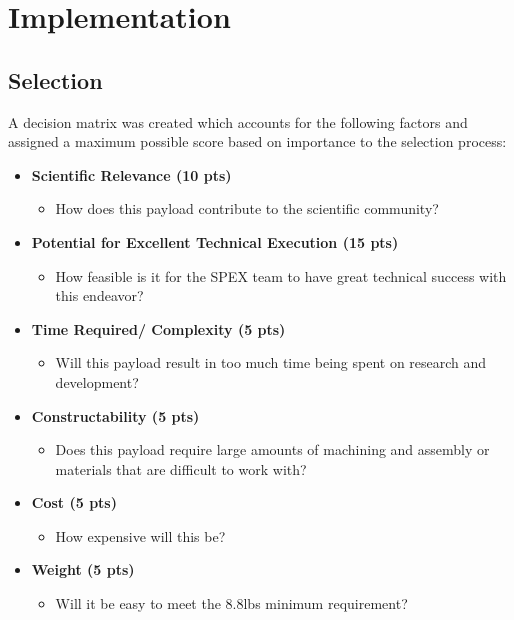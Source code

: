 \documentclass[conference]{IEEEtran} %
\begin{document}
\section{Implementation}
\label{sec:Implementation}

\subsection{Selection}
\label{subsec:Selection}
A decision matrix was created which accounts for the following factors and assigned a maximum possible
score based on importance to the selection process:
\begin{itemize}
  \item \textbf{Scientific Relevance (10 pts)}
  \begin{itemize}
    \item How does this payload contribute to the scientific community?
  \end{itemize}

  \item \textbf{Potential for Excellent Technical Execution (15 pts)}
  \begin{itemize}
    \item How feasible is it for the SPEX team to have great technical success with this endeavor?
  \end{itemize}

  \item \textbf{Time Required/ Complexity (5 pts)}
  \begin{itemize}
    \item Will this payload result in too much time being spent on research and development?
  \end{itemize}

  \item \textbf{Constructability (5 pts)}
  \begin{itemize}
    \item Does this payload require large amounts of machining and assembly or materials that are difficult to work with?
  \end{itemize}

  \item \textbf{Cost (5 pts)}
  \begin{itemize}
    \item How expensive will this be?
  \end{itemize}

  \item \textbf{Weight (5 pts)}
  \begin{itemize}
    \item Will it be easy to meet the 8.8lbs minimum requirement?
  \end{itemize}


\end{itemize}
\end{document}
